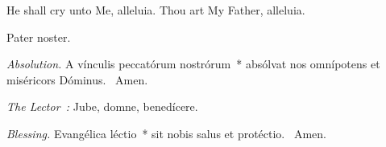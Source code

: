 {  \bigskip
  {
    {He shall cry unto Me, alleluia.}
    {Thou art My Father, alleluia.}
  }

  {
    {Pater noster.}

    \smallskip
    \emph{Absolution.} A vínculis peccatórum nostrórum~* absólvat nos omnípotens et miséricors Dóminus. \Rbar{}~Amen.

    \emph{The Lector~:} Jube, domne, benedícere.

    \emph{Blessing.} Evangélica léctio~* sit nobis salus et protéctio. \Rbar{}~Amen.
  }

  \bigskip{}
  {


  }

  {

}}
